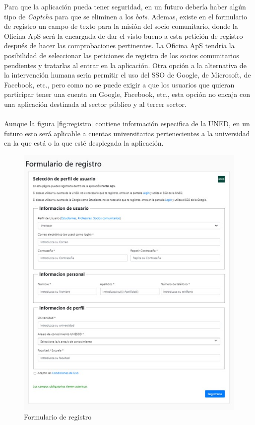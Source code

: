 \documentclass[11pt]{book}
\begin{document}
 Para que la aplicación pueda tener seguridad, en un futuro debería haber algún tipo de \emph{Captcha} para que se eliminen a los \emph{bots}. Ademas, existe en el formulario de registro un campo de texto para la misión del socio comunitario, donde la Oficina ApS será la encargada de dar el visto bueno a esta petición de registro después de hacer las comprobaciones pertinentes. La Oficina ApS tendría la posibilidad de seleccionar las peticiones de registro de los socios comunitarios pendientes y tratarlas al entrar en la aplicación. Otra opción a la alternativa de la intervención humana seria permitir el uso del SSO de Google, de Microsoft, de Facebook, etc., pero como no se puede exigir a que los usuarios que quieran participar tener una cuenta en Google, Facebook, etc., esta opción no encaja con una aplicación destinada al sector público y al tercer sector. \\\\
 Aunque la figura \ref{fig:registro} contiene información especifica de la UNED, en un futuro esto será aplicable a cuentas universitarias pertenecientes a la universidad en la que está o la que esté desplegada la aplicación.
 \begin{figure}[t]
 	\centering
 	\includegraphics[scale=0.7]{registro}
 	\caption{Formulario de registro}
 \end{figure}
\end{document}
